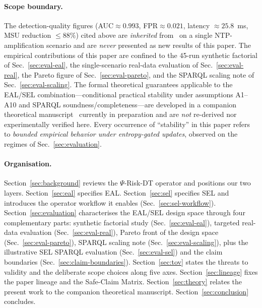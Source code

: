 \documentclass[futureinternet,article,submit,pdftex,moreauthors]{Definitions/mdpi}
\newcommand{\psiop}{\ensuremath{\Psi}}
\begin{document}
\paragraph{Scope boundary.}
The detection-quality figures (AUC$\approx 0.993$, FPR$\approx 0.021$,
latency $\approx 25.8$~ms, MSU reduction $\leq 88\%$) cited above are
\emph{inherited} from~\cite{paper3} on a single NTP-amplification
scenario and are \emph{never} presented as new results of this paper.
The empirical contributions of this paper are confined to the 45-run
synthetic factorial of Sec.~\ref{sec:eval-eal}, the single-scenario
real-data evaluation of Sec.~\ref{sec:eval-real}, the Pareto figure of
Sec.~\ref{sec:eval-pareto}, and the SPARQL scaling note of
Sec.~\ref{sec:eval-scaling}. The formal theoretical guarantees applicable
to the EAL/SEL combination---conditional practical stability under
assumptions A1--A10 and SPARQL soundness/completeness---are developed
in a companion theoretical manuscript~\cite{paper5} currently in
preparation and are \emph{not} re-derived nor experimentally verified
here. Every occurrence of ``stability'' in this paper refers to
\emph{bounded empirical behavior under entropy-gated updates}, observed
on the regimes of Sec.~\ref{sec:evaluation}.

\paragraph{Organisation.} Section~\ref{sec:background} reviews the
$\psiop$-Risk-DT operator and positions our two layers.
Section~\ref{sec:eal} specifies EAL. Section~\ref{sec:sel} specifies SEL
and introduces the operator workflow it enables
(Sec.~\ref{sec:sel-workflow}).
Section~\ref{sec:evaluation} characterises the EAL/SEL design space
through four complementary parts: synthetic factorial study
(Sec.~\ref{sec:eval-eal}), targeted real-data evaluation
(Sec.~\ref{sec:eval-real}), Pareto front of the design space
(Sec.~\ref{sec:eval-pareto}), SPARQL scaling note
(Sec.~\ref{sec:eval-scaling}), plus the illustrative SEL SPARQL
evaluation (Sec.~\ref{sec:eval-sel}) and the claim boundaries
(Sec.~\ref{sec:claim-boundaries}). Section~\ref{sec:tov} states the
threats to validity and the deliberate scope choices along five axes.
Section~\ref{sec:lineage} fixes the paper lineage and the Safe-Claim
Matrix. Section~\ref{sec:theory} relates the present work to the
companion theoretical manuscript. Section~\ref{sec:conclusion}
concludes.

\end{document}
